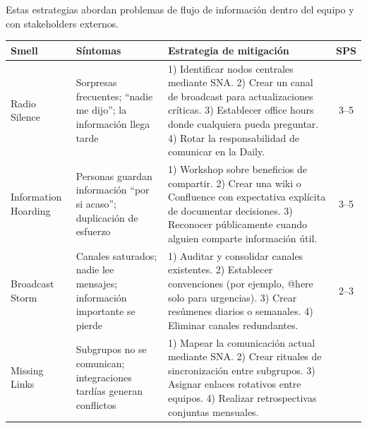 Estas estrategias abordan problemas de flujo de información dentro del equipo y con stakeholders externos.

\begin{table}[h]
    \centering
    \footnotesize
    \begin{tabularx}{\textwidth}{|l|X|X|c|}
        \hline
        \textbf{Smell} & \textbf{Síntomas}                                                       & \textbf{Estrategia de mitigación} & \textbf{SPS} \\
        \hline
        Radio Silence
                       & Sorpresas frecuentes; “nadie me dijo”; la información llega tarde
                       & 1) Identificar nodos centrales mediante SNA.
        2) Crear un canal de broadcast para actualizaciones críticas.
        3) Establecer office hours donde cualquiera pueda preguntar.
        4) Rotar la responsabilidad de comunicar en la Daily.
                       & 3--5                                                                                                                       \\
        \hline
        Information Hoarding
                       & Personas guardan información “por si acaso”; duplicación de esfuerzo
                       & 1) Workshop sobre beneficios de compartir.
        2) Crear una wiki o Confluence con expectativa explícita de documentar decisiones.
        3) Reconocer públicamente cuando alguien comparte información útil.
                       & 3--5                                                                                                                       \\
        \hline
        Broadcast Storm
                       & Canales saturados; nadie lee mensajes; información importante se pierde
                       & 1) Auditar y consolidar canales existentes.
        2) Establecer convenciones (por ejemplo, @here solo para urgencias).
        3) Crear resúmenes diarios o semanales.
        4) Eliminar canales redundantes.
                       & 2--3                                                                                                                       \\
        \hline
        Missing Links
                       & Subgrupos no se comunican; integraciones tardías generan conflictos
                       & 1) Mapear la comunicación actual mediante SNA.
        2) Crear rituales de sincronización entre subgrupos.
        3) Asignar enlaces rotativos entre equipos.
        4) Realizar retrospectivas conjuntas mensuales.

\end{tabularx}
\end{table}
